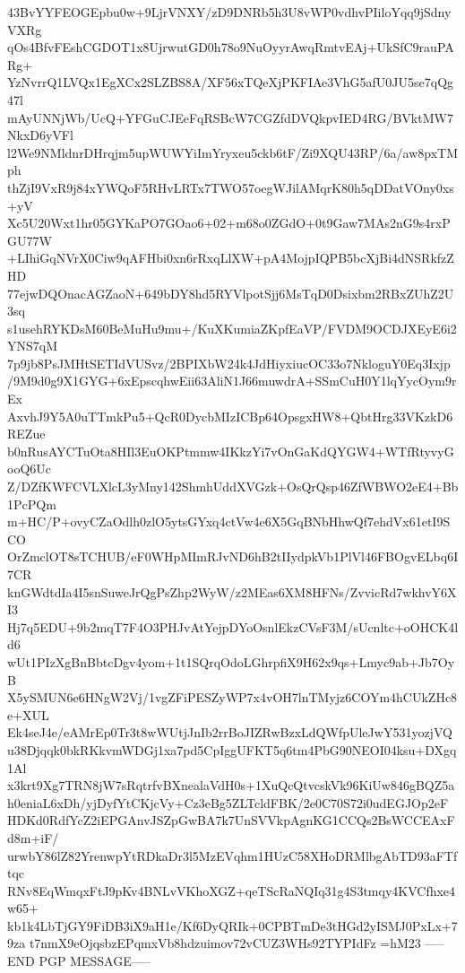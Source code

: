 43BvYYFEOGEpbu0w+9LjrVNXY/zD9DNRb5h3U8vWP0vdhvPIiloYqq9jSdnyVXRg
qOs4BfvFEshCGDOT1x8UjrwutGD0h78o9NuOyyrAwqRmtvEAj+UkSfC9rauPARg+
YzNvrrQ1LVQx1EgXCx2SLZBS8A/XF56xTQeXjPKFIAe3VhG5afU0JU5se7qQg47l
mAyUNNjWb/UcQ+YFGuCJEeFqRSBcW7CGZfdDVQkpvIED4RG/BVktMW7NkxD6yVFl
l2We9NMldnrDHrqjm5upWUWYiImYryxeu5ckb6tF/Zi9XQU43RP/6a/aw8pxTMph
thZjI9VxR9j84xYWQoF5RHvLRTx7TWO57oegWJilAMqrK80h5qDDatVOny0xs+yV
Xc5U20Wxt1hr05GYKaPO7GOao6+02+m68o0ZGdO+0t9Gaw7MAs2nG9s4rxPGU77W
+LIhiGqNVrX0Ciw9qAFHbi0xn6rRxqLlXW+pA4MojpIQPB5bcXjBi4dNSRkfzZHD
77ejwDQOnacAGZaoN+649bDY8hd5RYVlpotSjj6MsTqD0Dsixbm2RBxZUhZ2U3sq
s1usehRYKDsM60BeMuHu9mu+/KuXKumiaZKpfEaVP/FVDM9OCDJXEyE6i2YNS7qM
7p9jb8PsJMHtSETIdVUSvz/2BPIXbW24k4JdHiyxiucOC33o7NkloguY0Eq3Ixjp
/9M9d0g9X1GYG+6xEpscqhwEii63AliN1J66muwdrA+SSmCuH0Y1lqYycOym9rEx
AxvhJ9Y5A0uTTmkPu5+QcR0DycbMIzICBp64OpsgxHW8+QbtHrg33VKzkD6REZue
b0nRusAYCTuOta8HIl3EuOKPtmmw4IKkzYi7vOnGaKdQYGW4+WTfRtyvyGooQ6Uc
Z/DZfKWFCVLXlcL3yMny142ShmhUddXVGzk+OsQrQsp46ZfWBWO2eE4+Bb1PcPQm
m+HC/P+ovyCZaOdlh0zlO5ytsGYxq4ctVw4e6X5GqBNbHhwQf7ehdVx61etI9SCO
OrZmclOT8sTCHUB/eF0WHpMImRJvND6hB2tIIydpkVb1PlVl46FBOgvELbq6I7CR
knGWdtdIa4I5snSuweJrQgPsZhp2WyW/z2MEas6XM8HFNs/ZvvicRd7wkhvY6XI3
Hj7q5EDU+9b2mqT7F4O3PHJvAtYejpDYoOsnlEkzCVsF3M/sUcnltc+oOHCK4ld6
wUt1PIzXgBnBbtcDgv4yom+1t1SQrqOdoLGhrpfiX9H62x9qs+Lmyc9ab+Jb7OyB
X5ySMUN6e6HNgW2Vj/1vgZFiPESZyWP7x4vOH7lnTMyjz6COYm4hCUkZHc8e+XUL
Ek4seJ4e/eAMrEp0Tr3t8wWUtjJnIb2rrBoJIZRwBzxLdQWfpUleJwY531yozjVQ
u38Djqqk0bkRKkvmWDGj1xa7pd5CpIggUFKT5q6tm4PbG90NEOI04ksu+DXgq1Al
x3krt9Xg7TRN8jW7sRqtrfvBXnealaVdH0s+1XuQcQtvcskVk96KiUw846gBQZ5a
h0eniaL6xDh/yjDyfYtCKjcVy+Cz3eBg5ZLTcldFBK/2e0C70S72i0udEGJOp2eF
HDKd0RdfYcZ2iEPGAnvJSZpGwBA7k7UnSVVkpAgnKG1CCQs2BsWCCEAxFd8m+iF/
urwbY86lZ82YrenwpYtRDkaDr3l5MzEVqhm1HUzC58XHoDRMlbgAbTD93aFTftqc
RNv8EqWmqxFtJ9pKv4BNLvVKhoXGZ+qeTScRaNQIq31g4S3tmqy4KVCfhxe4w65+
kb1k4LbTjGY9FiDB3iX9aH1e/Kf6DyQRIk+0CPBTmDe3tHGd2yISMJ0PxLx+79za
t7nmX9eOjqsbzEPqmxVb8hdzuimov72vCUZ3WHs92TYPIdFz
=hM23
-----END PGP MESSAGE-----
